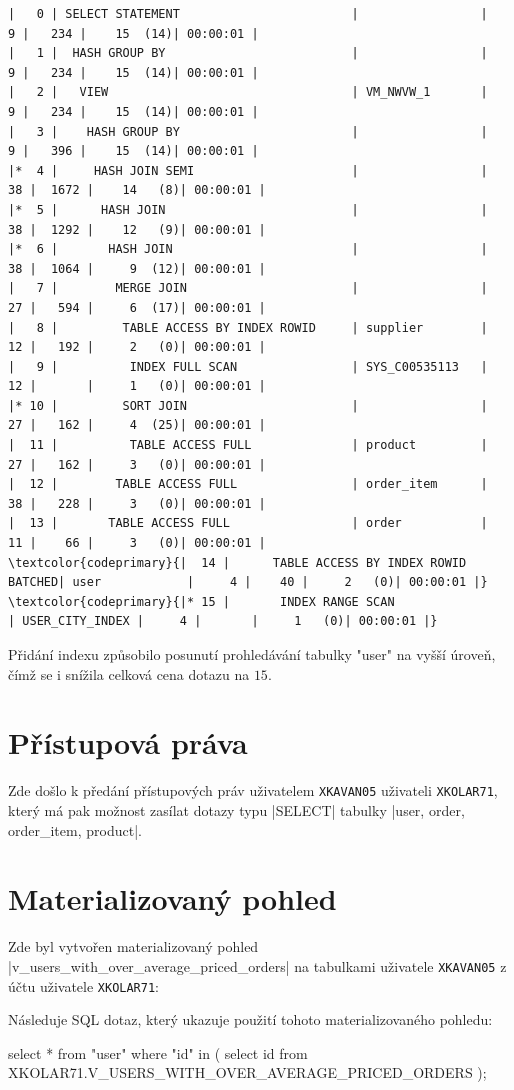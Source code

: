 \documentclass[12pt,a4paper]{article}
\makeatletter
\newcommand\ic[1][green]{%
    \@testopt{\@ic{#1}}{-#1}%
}
\def\@ic#1[#2]{%
    \Collectverb{\@@ic{#1}{#2}}%
}
\def\@@ic#1#2#3{%
    {\lstinline[basicstyle=\ttfamily\color{codeprimary},breaklines=true]|#3|}%
}
\makeatother
\begin{document}
{\scriptsize
	\begin{Verbatim}[commandchars=\\\{\}]
|   0 | SELECT STATEMENT                        |                 |     9 |   234 |    15  (14)| 00:00:01 |
|   1 |  HASH GROUP BY                          |                 |     9 |   234 |    15  (14)| 00:00:01 |
|   2 |   VIEW                                  | VM_NWVW_1       |     9 |   234 |    15  (14)| 00:00:01 |
|   3 |    HASH GROUP BY                        |                 |     9 |   396 |    15  (14)| 00:00:01 |
|*  4 |     HASH JOIN SEMI                      |                 |    38 |  1672 |    14   (8)| 00:00:01 |
|*  5 |      HASH JOIN                          |                 |    38 |  1292 |    12   (9)| 00:00:01 |
|*  6 |       HASH JOIN                         |                 |    38 |  1064 |     9  (12)| 00:00:01 |
|   7 |        MERGE JOIN                       |                 |    27 |   594 |     6  (17)| 00:00:01 |
|   8 |         TABLE ACCESS BY INDEX ROWID     | supplier        |    12 |   192 |     2   (0)| 00:00:01 |
|   9 |          INDEX FULL SCAN                | SYS_C00535113   |    12 |       |     1   (0)| 00:00:01 |
|* 10 |         SORT JOIN                       |                 |    27 |   162 |     4  (25)| 00:00:01 |
|  11 |          TABLE ACCESS FULL              | product         |    27 |   162 |     3   (0)| 00:00:01 |
|  12 |        TABLE ACCESS FULL                | order_item      |    38 |   228 |     3   (0)| 00:00:01 |
|  13 |       TABLE ACCESS FULL                 | order           |    11 |    66 |     3   (0)| 00:00:01 |
\textcolor{codeprimary}{|  14 |      TABLE ACCESS BY INDEX ROWID BATCHED| user            |     4 |    40 |     2   (0)| 00:00:01 |}
\textcolor{codeprimary}{|* 15 |       INDEX RANGE SCAN                  | USER_CITY_INDEX |     4 |       |     1   (0)| 00:00:01 |}
	\end{Verbatim}
}
	Přidání indexu způsobilo posunutí prohledávání tabulky "user" na vyšší úroveň, čímž se i snížila celková cena dotazu na $15$. 

	\section{Přístupová práva}
	Zde došlo k předání přístupových práv uživatelem \texttt{XKAVAN05} uživateli \texttt{XKOLAR71}, který má pak možnost zasílat dotazy typu \ic|SELECT| tabulky \ic|user, order, order_item, product|.

	\section{Materializovaný pohled}
	Zde byl vytvořen materializovaný pohled \ic|v_users_with_over_average_priced_orders| na tabulkami uživatele \texttt{XKAVAN05} z účtu uživatele \texttt{XKOLAR71}:

	Následuje SQL dotaz, který ukazuje použití tohoto materializovaného pohledu:

	\vspace{15pt}

	\begin{code}
select *
from "user"
where "id" in (
	select id
	from XKOLAR71.V_USERS_WITH_OVER_AVERAGE_PRICED_ORDERS
);
	\end{code}
	
\end{document}

